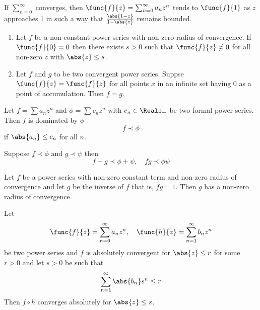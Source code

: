 \begin{theorem}
    If \(\sum_{n = 0}^{\infty}\) converges, then \(\func{f}{z} = \sum_{n = 0}^{\infty} a_n z^n\) tends to \(\func{f}{1}\) as \(z\) approaches 1 in such a way that \(\frac{\abs{1- z}}{1 - \abs{z}}\) remains bounded.
\end{theorem}

\begin{theorem}
    \begin{enumerate}
        \item  Let \(f\) be a non-constant power series with non-zero radius of convergence. If \(\func{f}{0} = 0\) then there exists \(s > 0\) such that \(\func{f}{z} \neq 0\) for all non-zero \(z\) with \(\abs{z} \leq s\).
        \item Let \(f\) and \(g\) to be two convergent power series. Suppse \(\func{f}{z} = \func{f}{z}\) for all points \(x\) in an infinite set having 0 as a point of accumulation. Then \(f= g\).
    \end{enumerate}
\end{theorem}

Let \(f = \sum a_nz^n\) and \(\phi = \sum c_n z^n\) with \(c_n \in \Reals_+\) be two formal power series. Then \(f\) is dominated by \(\phi\)
\begin{equation*}
    f \prec \phi 
\end{equation*}
if \(\abs{a_n} \leq c_n\) for all \(n\).

\begin{proposition}
    Suppose \(f \prec \phi\) and \(g \prec \psi\) then 
    \begin{equation*}
        f + g \prec \phi + \psi , \quad fg \prec \phi \psi
    \end{equation*}
\end{proposition}

\begin{theorem}
    Let \(f\) be a power series with non-zero constant term and non-zero radius of convergence and let \(g\) be the inverse of \(f\) that is, \(fg = 1\). Then \(g\) has a non-zero radius of convergence.
\end{theorem}

\begin{proposition}
    Let 
    \begin{equation*}
        \func{f}{z} = \sum_{n = 0}^{\infty} a_n z^n , \quad \func{h}{z} = \sum_{n = 1}^{\infty} b_n z^n
    \end{equation*}
    be two power series and \(f\) is absolutely convergent for \(\abs{z} \leq r\) for some \(r > 0\) and let \(s > 0\) be such that 
    \begin{equation*}
        \sum_{n=1}^{\infty} \abs{b_n}s^n \leq r
    \end{equation*}
    Then \(f\circ h\) converges absolutely for \(\abs{z} \leq s\).
\end{proposition}

